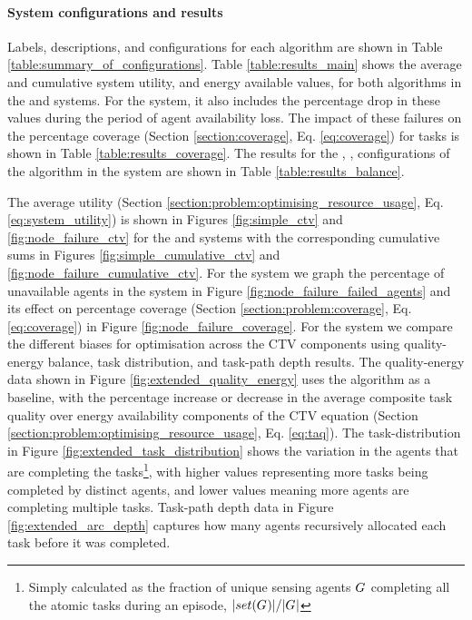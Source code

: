 \paragraph{System configurations and results}
Labels, descriptions, and configurations for each algorithm are shown in Table \ref{table:summary_of_configurations}. Table \ref{table:results_main} shows the average and cumulative system utility, and energy available values, for both algorithms in the \simulationSimple{}{} and  \simulationNodeFailure{}{} systems. For the \simulationNodeFailure{}{} system, it also includes the percentage drop in these values during the period of agent availability loss. The impact of these failures on the percentage coverage (Section \ref{section:coverage}, Eq. \ref{eq:coverage}) for tasks is shown in Table \ref{table:results_coverage}. The results for the \algorithmEnergy{}{}, \algorithmQuality{}{}, \algorithmDistribution{}{} configurations of the \acronymWSNOptimisation{}{} algorithm in the \simulationExtended{}{} system are shown in Table \ref{table:results_balance}. 

The average utility (Section \ref{section:problem:optimising_resource_usage}, Eq. \ref{eq:system_utility}) is shown in Figures \ref{fig:simple_ctv} and \ref{fig:node_failure_ctv} for the \simulationSimple{}{} and \simulationNodeFailure{}{} systems with the corresponding cumulative sums in Figures \ref{fig:simple_cumulative_ctv} and \ref{fig:node_failure_cumulative_ctv}. For the \simulationNodeFailure{}{} system we graph the percentage of unavailable agents in the system in Figure \ref{fig:node_failure_failed_agents} and its effect on percentage coverage (Section \ref{section:problem:coverage}, Eq. \ref{eq:coverage}) in Figure \ref{fig:node_failure_coverage}.  For the \simulationExtended{}{} system we compare the different biases for optimisation across the CTV components using quality-energy balance, task distribution, and task-path depth results. The quality-energy data shown in Figure \ref{fig:extended_quality_energy} uses the \algorithmEnergy{}{} algorithm as a baseline, with the percentage increase or decrease in the average composite task quality over energy availability components of the CTV equation (Section \ref{section:problem:optimising_resource_usage}, Eq. \ref{eq:taq}). The task-distribution in Figure \ref{fig:extended_task_distribution} shows the variation in the agents that are completing the tasks\footnote{ Simply calculated as the fraction of unique sensing agents $G_{}^{}$ completing all the atomic tasks during an episode, $\lvert set(G_{}^{}) \rvert{}/\lvert G_{}^{} \rvert{}$}, with higher values representing more tasks being completed by distinct agents, and lower values meaning more agents are completing multiple tasks. Task-path depth data in Figure \ref{fig:extended_arc_depth} captures how many agents recursively allocated each task before it was completed.